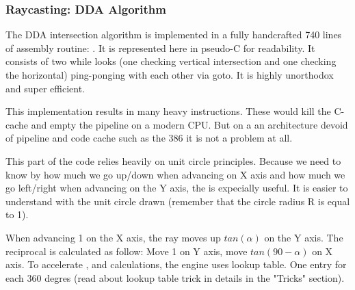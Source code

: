  
 
 
 
 
 
 
 
\subsubsection{Raycasting: DDA Algorithm}
The DDA intersection algorithm is implemented in a fully handcrafted 740 lines of assembly routine: . It is represented here in pseudo-C for readability. It consists of two while looks (one checking vertical intersection and one checking the horizontal) ping-ponging with each other via goto. It is highly unorthodox and super efficient.\\
\par



\begin{minipage}{\textwidth}

\end{minipage}
This implementation results in many heavy  instructions. These would kill the C-cache and empty the pipeline on a modern CPU. But on a an architecture devoid of pipeline and code cache such as the 386 it is not a problem at all.\\
\par
This part of the code relies heavily on unit circle principles. Because we need to know by how much we go up/down when advancing on X axis and how much we go left/right when advancing on the Y axis, the  is expecially useful. It is easier to understand with the unit circle drawn (remember that the circle radius R is equal to 1).
\begin{figure}[H]
\centering
 
\end{figure}
\par
When advancing 1 on the X axis, the ray moves up $tan(\alpha)$ on the Y axis. The reciprocal is calculated as follow: Move 1 on Y axis, move $tan(90-\alpha)$ on X axis. To accelerate ,  and  calculations, the engine uses lookup table. One entry for each 360 degres (read about lookup table trick in details in the "Tricks" section).




















